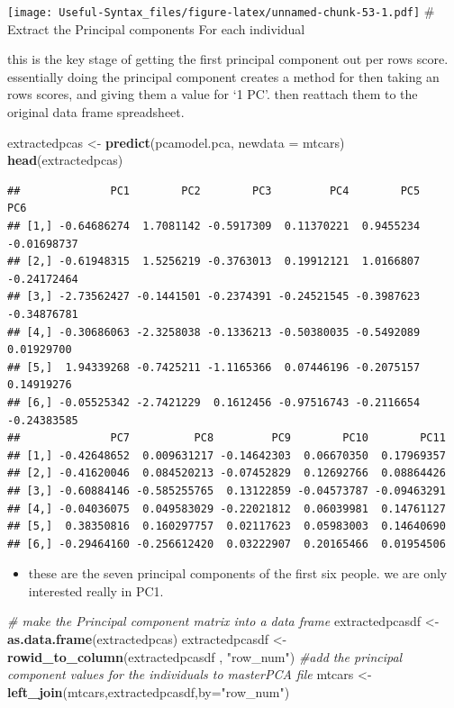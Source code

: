 \documentclass[
]{article}
\newenvironment{Shaded}{\begin{snugshade}}{\end{snugshade}}
\newcommand{\AttributeTok}[1]{\textcolor[rgb]{0.13,0.29,0.53}{#1}}
\newcommand{\CommentTok}[1]{\textcolor[rgb]{0.56,0.35,0.01}{\textit{#1}}}
\newcommand{\FunctionTok}[1]{\textcolor[rgb]{0.13,0.29,0.53}{\textbf{#1}}}
\newcommand{\NormalTok}[1]{#1}
\newcommand{\OtherTok}[1]{\textcolor[rgb]{0.56,0.35,0.01}{#1}}
\newcommand{\StringTok}[1]{\textcolor[rgb]{0.31,0.60,0.02}{#1}}
\providecommand{\tightlist}{%
  \setlength{\itemsep}{0pt}\setlength{\parskip}{0pt}}
\begin{document}
\texttt{[image: Useful-Syntax\_files/figure-latex/unnamed-chunk-53-1.pdf]}
\# Extract the Principal components For each individual

this is the key stage of getting the first principal component out per rows score. essentially doing the principal component creates a method for then taking an rows scores, and giving them a value for `1 PC'. then reattach them to the original data frame spreadsheet.

\begin{Shaded}
\begin{Highlighting}[]
\NormalTok{extractedpcas }\OtherTok{\textless{}{-}} \FunctionTok{predict}\NormalTok{(pcamodel.pca, }\AttributeTok{newdata =}\NormalTok{ mtcars)}
\FunctionTok{head}\NormalTok{(extractedpcas)}
\end{Highlighting}
\end{Shaded}

\begin{verbatim}
##              PC1        PC2        PC3         PC4        PC5         PC6
## [1,] -0.64686274  1.7081142 -0.5917309  0.11370221  0.9455234 -0.01698737
## [2,] -0.61948315  1.5256219 -0.3763013  0.19912121  1.0166807 -0.24172464
## [3,] -2.73562427 -0.1441501 -0.2374391 -0.24521545 -0.3987623 -0.34876781
## [4,] -0.30686063 -2.3258038 -0.1336213 -0.50380035 -0.5492089  0.01929700
## [5,]  1.94339268 -0.7425211 -1.1165366  0.07446196 -0.2075157  0.14919276
## [6,] -0.05525342 -2.7421229  0.1612456 -0.97516743 -0.2116654 -0.24383585
##              PC7          PC8         PC9        PC10        PC11
## [1,] -0.42648652  0.009631217 -0.14642303  0.06670350  0.17969357
## [2,] -0.41620046  0.084520213 -0.07452829  0.12692766  0.08864426
## [3,] -0.60884146 -0.585255765  0.13122859 -0.04573787 -0.09463291
## [4,] -0.04036075  0.049583029 -0.22021812  0.06039981  0.14761127
## [5,]  0.38350816  0.160297757  0.02117623  0.05983003  0.14640690
## [6,] -0.29464160 -0.256612420  0.03222907  0.20165466  0.01954506
\end{verbatim}

\begin{itemize}
\tightlist
\item
  these are the seven principal components of the first six people. we are only interested really in PC1.
\end{itemize}

\begin{Shaded}
\begin{Highlighting}[]
\CommentTok{\# make the Principal component matrix into a data frame }
\NormalTok{extractedpcasdf }\OtherTok{\textless{}{-}} \FunctionTok{as.data.frame}\NormalTok{(extractedpcas)}
\NormalTok{extractedpcasdf }\OtherTok{\textless{}{-}} \FunctionTok{rowid\_to\_column}\NormalTok{(extractedpcasdf , }\StringTok{"row\_num"}\NormalTok{)}
\CommentTok{\#add the principal component values for the individuals to masterPCA file}
\NormalTok{mtcars }\OtherTok{\textless{}{-}} \FunctionTok{left\_join}\NormalTok{(mtcars,extractedpcasdf,}\AttributeTok{by=}\StringTok{"row\_num"}\NormalTok{)}
\end{Highlighting}
\end{Shaded}
\end{document}
